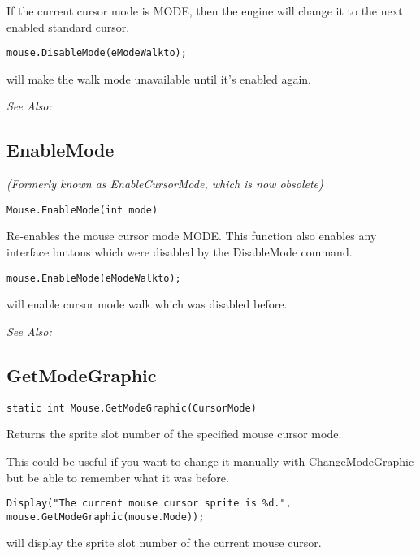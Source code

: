 If the current cursor mode is MODE, then the engine will change it to the
next enabled standard cursor.

\begin{verbatim}
mouse.DisableMode(eModeWalkto);
\end{verbatim}
will make the walk mode unavailable until it's enabled again.

\it{See Also:} 


\subsection{EnableMode}\label{Mouse.EnableMode}%

\it{(Formerly known as EnableCursorMode, which is now obsolete)}

\begin{verbatim}
Mouse.EnableMode(int mode)
\end{verbatim}
Re-enables the mouse cursor mode MODE. This function also enables any
interface buttons which were disabled by the DisableMode command.

\begin{verbatim}
mouse.EnableMode(eModeWalkto);
\end{verbatim}
will enable cursor mode walk which was disabled before.

\it{See Also:} 


\subsection{GetModeGraphic}\label{Mouse.GetModeGraphic}%

\begin{verbatim}
static int Mouse.GetModeGraphic(CursorMode)
\end{verbatim}
Returns the sprite slot number of the specified mouse cursor mode.

This could be useful if you want to change it manually with ChangeModeGraphic but be able
to remember what it was before.

\begin{verbatim}
Display("The current mouse cursor sprite is %d.", mouse.GetModeGraphic(mouse.Mode));
\end{verbatim}
will display the sprite slot number of the current mouse cursor.

